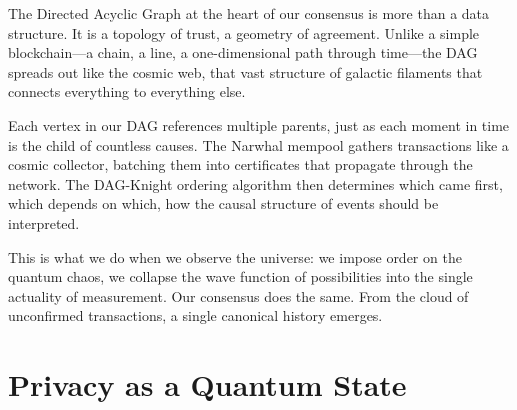 \documentclass[12pt,a4paper]{article}
\begin{document}
The Directed Acyclic Graph at the heart of our consensus is more than a data structure. It is a topology of trust, a geometry of agreement. Unlike a simple blockchain---a chain, a line, a one-dimensional path through time---the DAG spreads out like the cosmic web, that vast structure of galactic filaments that connects everything to everything else.

\begin{center}
\end{center}

Each vertex in our DAG references multiple parents, just as each moment in time is the child of countless causes. The Narwhal mempool gathers transactions like a cosmic collector, batching them into certificates that propagate through the network. The DAG-Knight ordering algorithm then determines which came first, which depends on which, how the causal structure of events should be interpreted.

This is what we do when we observe the universe: we impose order on the quantum chaos, we collapse the wave function of possibilities into the single actuality of measurement. Our consensus does the same. From the cloud of unconfirmed transactions, a single canonical history emerges.

\section{Privacy as a Quantum State}
\end{document}
